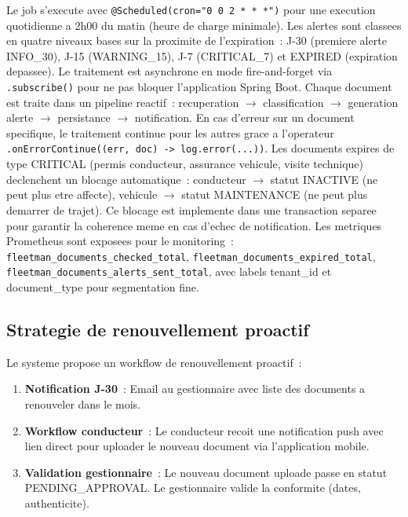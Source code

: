 \documentclass[12pt,a4paper]{report}
\begin{document}
\begin{enumerate}[leftmargin=2cm]
\begin{lecture}
Le job s'execute avec \texttt{@Scheduled(cron="0 0 2 * * *")} pour
une execution quotidienne a 2h00 du matin (heure de charge minimale).
Les alertes sont classees en quatre niveaux bases sur la proximite de
l'expiration~: J-30 (premiere alerte INFO\_30), J-15 (WARNING\_15),
J-7 (CRITICAL\_7) et EXPIRED (expiration depassee). Le traitement est
asynchrone en mode fire-and-forget via \texttt{.subscribe()} pour ne pas
bloquer l'application Spring Boot. Chaque document est traite dans un
pipeline reactif~: recuperation $\to$ classification $\to$ generation
alerte $\to$ persistance $\to$ notification. En cas d'erreur sur un
document specifique, le traitement continue pour les autres grace a
l'operateur \texttt{.onErrorContinue((err, doc) -> log.error(...))}.
Les documents expires de type CRITICAL (permis conducteur, assurance
vehicule, visite technique) declenchent un blocage automatique~:
conducteur $\to$ statut INACTIVE (ne peut plus etre affecte), vehicule
$\to$ statut MAINTENANCE (ne peut plus demarrer de trajet). Ce blocage
est implemente dans une transaction separee pour garantir la coherence
meme en cas d'echec de notification. Les metriques Prometheus sont exposees
pour le monitoring~: \texttt{fleetman\_documents\_checked\_total},
\texttt{fleetman\_documents\_expired\_total},
\texttt{fleetman\_documents\_alerts\_sent\_total}, avec labels tenant\_id
et document\_type pour segmentation fine.
\end{lecture}

\subsection{Strategie de renouvellement proactif}

Le systeme propose un workflow de renouvellement proactif~:

\begin{enumerate}[leftmargin=2cm]
  \item \textbf{Notification J-30}~: Email au gestionnaire avec liste
        des documents a renouveler dans le mois.
        
  \item \textbf{Workflow conducteur}~: Le conducteur recoit une notification
        push avec lien direct pour uploader le nouveau document via
        l'application mobile.
        
  \item \textbf{Validation gestionnaire}~: Le nouveau document uploade
        passe en statut PENDING\_APPROVAL. Le gestionnaire valide la
        conformite (dates, authenticite).
        

\end{enumerate}
\end{enumerate}
\end{document}
